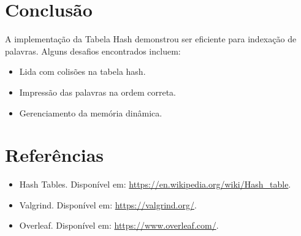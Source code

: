 \documentclass[a4paper,12pt]{article}
\begin{document}
\section{Conclus\~ao}
A implementa\c{c}\~ao da Tabela Hash demonstrou ser eficiente para indexa\c{c}\~ao de palavras. Alguns desafios encontrados incluem:
\begin{itemize}
    \item Lida com colis\~oes na tabela hash.
    \item Impress\~ao das palavras na ordem correta.
    \item Gerenciamento da mem\'oria din\^amica.
\end{itemize}

\section{Refer\^encias}
\begin{itemize}
    \item Hash Tables. Dispon\'ivel em: \url{https://en.wikipedia.org/wiki/Hash_table}.
    \item Valgrind. Dispon\'ivel em: \url{https://valgrind.org/}.
    \item Overleaf. Dispon\'ivel em: \url{https://www.overleaf.com/}.
\end{itemize}
\end{document}
